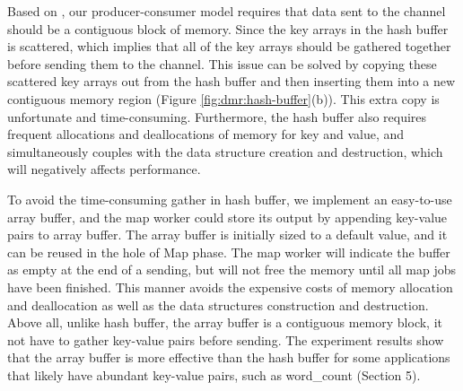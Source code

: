 
Based on \myth, our producer-consumer model  requires that data sent to the channel should be a contiguous block of memory.
Since the key arrays in the hash buffer is scattered, which implies that all of the key arrays should be gathered together before sending them to the channel.
This issue can be solved by copying these scattered key arrays out  from the hash buffer and then inserting them into a new contiguous memory region (Figure \ref{fig:dmr:hash-buffer}(b)).
This extra copy is unfortunate and time-consuming.
Furthermore, the hash buffer also requires frequent allocations and deallocations of memory for key and value, and simultaneously couples with the data structure creation and destruction, which will 
negatively affects performance.


To avoid the time-consuming gather in hash buffer, we  implement an easy-to-use array buffer, and the map worker could store its output by appending  key-value pairs to array buffer.
The array buffer is initially sized to a default value, and it can be reused in the hole of Map phase.
The map worker will indicate the buffer as empty at the end of a sending, but will not free the memory until all map jobs have been finished.
This manner avoids the expensive costs of memory allocation and deallocation as well as the data structures construction and destruction.
Above all, unlike hash buffer, the array buffer is a contiguous memory block, it not have to gather key-value pairs before sending.
The experiment results show that the array buffer is more effective than the hash buffer for some applications that likely have abundant key-value pairs, such as word\_count (Section 5).






